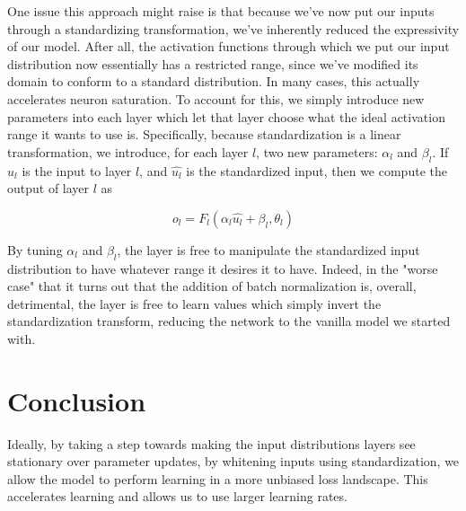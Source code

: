\documentclass{article}
\begin{document}
One issue this approach might raise is that because we've now put our inputs through a standardizing transformation, we've inherently reduced the expressivity of our model. After all, the activation functions through which we put our input distribution now essentially has a restricted range, since we've modified its domain to conform to a standard distribution. In many cases, this actually accelerates neuron saturation. To account for this, we simply introduce new parameters into each layer which let that layer choose what the ideal activation range it wants to use is. Specifically, because standardization is a linear transformation, we introduce, for each layer $ l $, two new parameters: $ \alpha_l $ and $ \beta_l $. If $ u_l $ is the input to layer $ l $, and $ \hat{u_l} $ is the standardized input, then we compute the output of layer $ l $ as

    $$ o_l = F_l(\alpha_l \hat{u_l} + \beta_l, \theta_l) $$

By tuning $ \alpha_l $ and $ \beta_l $, the layer is free to manipulate the standardized input distribution to have whatever range it desires it to have. Indeed, in the "worse case" that it turns out that the addition of batch normalization is, overall, detrimental, the layer is free to learn values which simply invert the standardization transform, reducing the network to the vanilla model we started with.

\section{Conclusion}
Ideally, by taking a step towards making the input distributions layers see stationary over parameter updates, by whitening inputs using standardization, we allow the model to perform learning in a more unbiased loss landscape. This accelerates learning and allows us to use larger learning rates.
\end{document}
